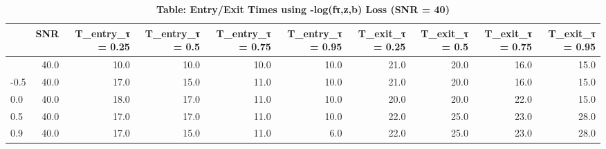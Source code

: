 \begin{table}[t]
\caption*{
{\fontsize{10}{13}\selectfont  \textbf{Table: Entry/Exit Times using -log(fτ,z,b) Loss (SNR = 40)}\small }
} 
\begin{tabular*}{\linewidth}{@{\extracolsep{\fill}}l|rrrrrrrrr}
\toprule
 & SNR & T\_entry\_τ = 0.25 & T\_entry\_τ = 0.5 & T\_entry\_τ = 0.75 & T\_entry\_τ = 0.95 & T\_exit\_τ = 0.25 & T\_exit\_τ = 0.5 & T\_exit\_τ = 0.75 & T\_exit\_τ = 0.95 \\ 
\midrule\addlinespace[2.5pt]
-0.9 & 40.0 & 10.0 & 10.0 & 10.0 & 10.0 & 21.0 & 20.0 & 16.0 & 15.0 \\ 
-0.5 & 40.0 & 17.0 & 15.0 & 11.0 & 10.0 & 21.0 & 20.0 & 16.0 & 15.0 \\ 
0.0 & 40.0 & 18.0 & 17.0 & 11.0 & 10.0 & 20.0 & 20.0 & 22.0 & 15.0 \\ 
0.5 & 40.0 & 17.0 & 17.0 & 11.0 & 10.0 & 22.0 & 25.0 & 23.0 & 28.0 \\ 
0.9 & 40.0 & 17.0 & 15.0 & 11.0 & 6.0 & 22.0 & 25.0 & 23.0 & 28.0 \\ 
\bottomrule
\end{tabular*}
\end{table}

